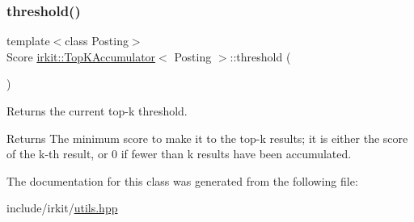 \subsubsection{\texorpdfstring{threshold()}{threshold()}}
{\footnotesize\ttfamily template$<$class Posting$>$ \\
Score \hyperlink{classirkit_1_1TopKAccumulator}{irkit\+::\+Top\+K\+Accumulator}$<$ Posting $>$\+::threshold (\begin{DoxyParamCaption}{ }\end{DoxyParamCaption})\hspace{0.3cm}{\ttfamily [inline]}}



Returns the current top-\/k threshold. 

\begin{DoxyReturn}{Returns}
The minimum score to make it to the top-\/k results; it is either the score of the k-\/th result, or 0 if fewer than k results have been accumulated. 
\end{DoxyReturn}


The documentation for this class was generated from the following file\+:\begin{DoxyCompactItemize}
\item 
include/irkit/\hyperlink{utils_8hpp}{utils.\+hpp}\end{DoxyCompactItemize}
